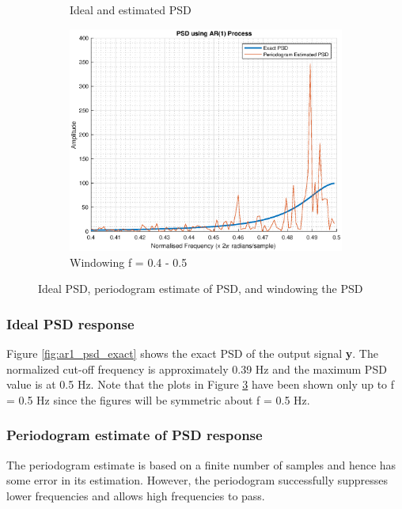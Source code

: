 \documentclass{article}
\begin{document}
\begin{figure}[h!]
\begin{subfigure}{0.32\textwidth}
\caption{Ideal and estimated PSD}
\label{fig:ar1_psd_est}
\end{subfigure}
\begin{subfigure}{0.32\textwidth}
\centering
\includegraphics[width = \textwidth]{ar1_psd_est_zoom}
\caption{Windowing f = 0.4 - 0.5}
\label{fig:ar1_psd_est_zoom}
\end{subfigure}
\caption{Ideal PSD, periodogram estimate of PSD, and windowing the PSD}
\label{fig:ar_spec}
\end{figure}


\subsubsection{Ideal PSD response}

Figure \ref{fig:ar1_psd_exact} shows the exact PSD of the output signal \textbf{y}. The normalized cut-off frequency is approximately 0.39 Hz and the maximum PSD value is at 0.5 Hz. Note that the plots in Figure \ref{fig:ar_spec} have been shown only up to f = 0.5 Hz since the figures will be symmetric about f = 0.5 Hz.

\subsubsection{Periodogram estimate of PSD response}

The periodogram estimate is based on a finite number of samples and hence has some error in its estimation. However, the periodogram successfully suppresses lower frequencies and allows high frequencies to pass.
\end{document}
